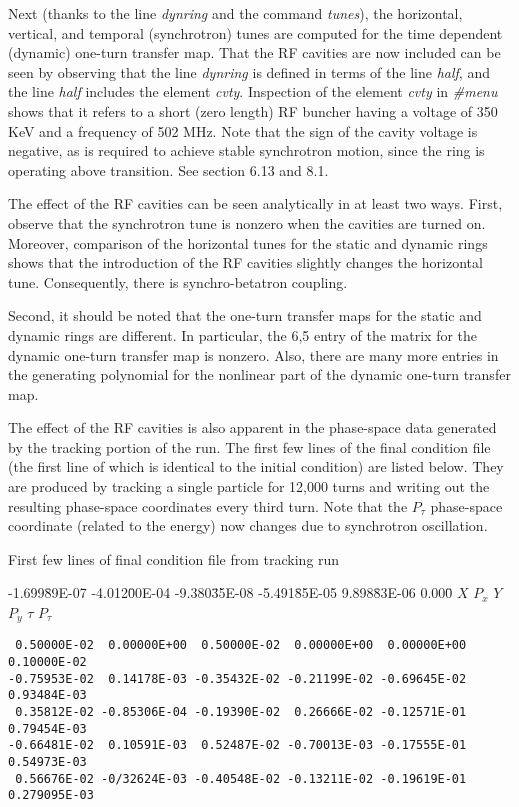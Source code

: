      Next (thanks to the line {\em dynring } and the command {\em tunes}\/), the
horizontal, vertical, and temporal (synchrotron) tunes are computed for the
time dependent (dynamic) one-turn transfer map.  That the RF cavities are
now included can be seen by observing that the line {\em dynring } is defined in
terms of the line {\em half}, and the line {\em half } includes the element {\em cvty}.
Inspection of the element {\em cvty } in {\em \#menu} shows that it refers to a short
(zero length) RF buncher having a voltage of 350 KeV and a frequency of 502
MHz.  Note that the sign of the cavity voltage is negative, as is
required to achieve stable synchrotron motion, since the ring is
operating above transition.  See section 6.13 and 8.1.

     The effect of the RF cavities can be seen analytically in at least two
ways.  First, observe that the synchrotron tune is nonzero when the
cavities are turned on.  Moreover, comparison of the horizontal tunes for
the static and dynamic rings shows that the introduction of the RF cavities
slightly changes the horizontal tune.  Consequently, there is
synchro-betatron coupling.

     Second, it should be noted that the one-turn transfer maps for the
static and dynamic rings are different.  In particular, the 6,5 entry of
the matrix for the dynamic one-turn transfer map is nonzero.  Also, there
are many more entries in the generating polynomial for the nonlinear part
of the dynamic one-turn transfer map.

     The effect of the RF cavities is also apparent in the phase-space data
generated by the tracking portion of the \Mary run.  The first few lines
of the final condition file (the first line of which is identical to the
initial condition) are listed below.  They are produced by tracking a
single particle for 12,000 turns and writing out the resulting phase-space
coordinates every third turn.  Note that the $P_{\tau}$  phase-space coordinate
(related to the energy) now changes due to synchrotron oscillation.
\vspace{5mm}

    First few lines of final condition file from tracking run
\begin{footnotesize}
\begin{tt}
\begin{tabbing}
-1.699\=89E-07 -4.012\=00E-04 -9.380\=35E-08 -5.491\=85E-05 9.898\=83E-06 0.000\= \kill
\>$X$ \>$P_x$ \>$Y$ \>$P_y$ \>$\tau$ \>$P_{\tau}$
\end{tabbing}
\end{tt}
\vspace{-5mm}
\begin{verbatim}
 0.50000E-02  0.00000E+00  0.50000E-02  0.00000E+00  0.00000E+00  0.10000E-02
-0.75953E-02  0.14178E-03 -0.35432E-02 -0.21199E-02 -0.69645E-02  0.93484E-03
 0.35812E-02 -0.85306E-04 -0.19390E-02  0.26666E-02 -0.12571E-01  0.79454E-03
-0.66481E-02  0.10591E-03  0.52487E-02 -0.70013E-03 -0.17555E-01  0.54973E-03
 0.56676E-02 -0/32624E-03 -0.40548E-02 -0.13211E-02 -0.19619E-01  0.279095E-03
\end{verbatim}
\end{footnotesize}


